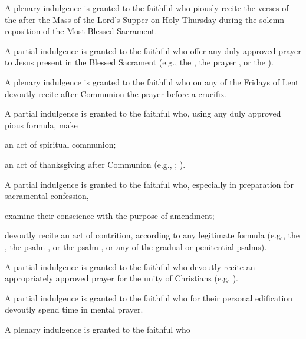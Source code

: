 \hypertarget{grant7}{}
 A plenary indulgence is granted to the faithful who  piously recite the verses of the  after the Mass of the Lord's Supper on Holy Thursday during the solemn reposition of the Most Blessed Sacrament.

 A partial indulgence is granted to the faithful who  offer any duly approved prayer to Jesus present in the Blessed Sacrament (e.g., the , the prayer , or the ).

\hypertarget{grant8}{}

 A plenary indulgence is granted to the faithful who  on any of the Fridays of Lent devoutly recite after Communion the prayer  before a crucifix.

 A partial indulgence is granted to the faithful who, using any duly approved pious formula, make

 an act of spiritual communion;

 an act of thanksgiving after Communion (e.g., ; ).

\hypertarget{grant9}{}
A partial indulgence is granted to the faithful who, especially in preparation for sacramental confession,

 examine their conscience with the purpose of amendment;

 devoutly recite an act of contrition, according to any legitimate formula (e.g., the , the psalm , or the psalm , or any of the gradual or penitential psalms).

\hypertarget{grant11}{}
 A partial indulgence is granted to the faithful who devoutly recite an appropriately approved prayer for the unity of Christians (e.g. ).

A partial indulgence is granted to the faithful who for their personal edification devoutly spend time in mental prayer.

\hypertarget{grant17}{}
 A plenary indulgence is granted to the faithful who

